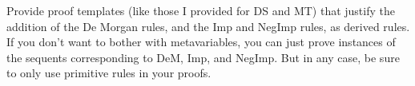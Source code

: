 \problempart
Provide proof templates (like those I provided for DS and MT) that justify the addition of the De Morgan rules, and the Imp and NegImp rules, as derived rules. If you don't want to bother with metavariables, you can just prove instances of the sequents corresponding to DeM, Imp, and NegImp.  But in any case, be sure to only use primitive rules in your proofs.

